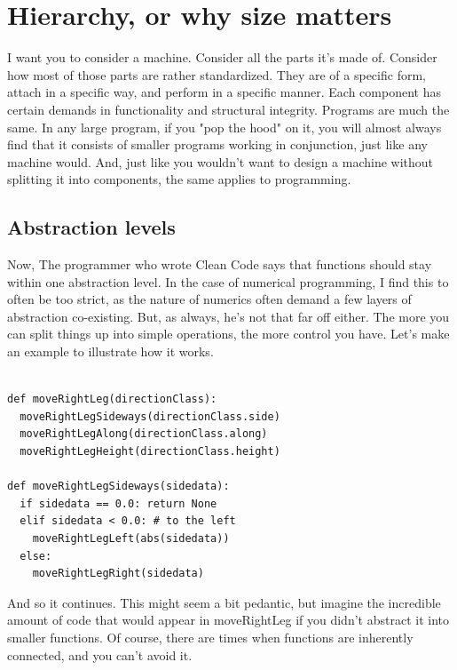 \documentclass[10pt,a4paper]{article}
\begin{document}

\newpage
\section{Hierarchy, or why size matters}

I want you to consider a machine. Consider all the parts it's made of. Consider how most of those parts are rather standardized. They are of a specific form, attach in a specific way, and perform in a specific manner. Each component has certain demands in functionality and structural integrity. Programs are much the same. In any large program, if you "pop the hood" on it, you will almost always find that it consists of smaller programs working in conjunction, just like any machine would. And, just like you wouldn't want to design a machine without splitting it into components, the same applies to programming. 

\subsection{Abstraction levels}
Now, The programmer who wrote Clean Code says that functions should stay within one abstraction level. In the case of numerical programming, I find this to often be too strict, as the nature of numerics often demand a few layers of abstraction co-existing. But, as always, he's not that far off either. The more you can split things up into simple operations, the more control you have. Let's make an example to illustrate how it works.

\begin{lstlisting}

def moveRightLeg(directionClass):
  moveRightLegSideways(directionClass.side)
  moveRightLegAlong(directionClass.along)
  moveRightLegHeight(directionClass.height)

def moveRightLegSideways(sidedata):
  if sidedata == 0.0: return None
  elif sidedata < 0.0: # to the left
    moveRightLegLeft(abs(sidedata))
  else:
    moveRightLegRight(sidedata)

\end{lstlisting}

And so it continues. This might seem a bit pedantic, but imagine the incredible amount of code that would appear in moveRightLeg if you didn't abstract it into smaller functions. Of course, there are times when functions are inherently connected, and you can't avoid it. 
\end{document}
